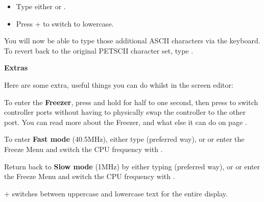 \begin{itemize}
  \item Type either  or .
  \item Press \megasymbolkey +  to switch to lowercase.
\end{itemize}

You will now be able to type those additional ASCII characters via the keyboard. To revert back to the original PETSCII character set, type .

\textbf{Extras}

Here are some extra, useful things you can do whilst in the screen editor:

To enter the \textbf{Freezer}, press and hold  for half to one second, then press  to
switch controller ports without having to physically swap the controller to the other port. You can read more about
the Freezer, and what else it can do on page \pageref{sec:freezer}.

  To enter \textbf{Fast mode} (40.5MHz), either type  (preferred way), or  or enter the Freeze Menu and switch the CPU frequency with .

  Return back to \textbf{Slow mode} (1MHz) by either typing  (preferred way), or  or enter the Freeze Menu and switch the CPU frequency with .

  \megasymbolkey +  switches between uppercase and lowercase text for the entire display.
